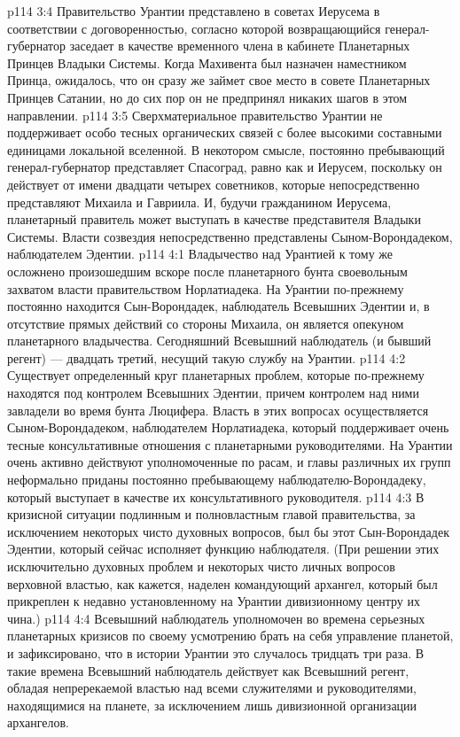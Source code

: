 \vs p114 3:4 \pc Правительство Урантии представлено в советах Иерусема в соответствии с договоренностью, согласно которой возвращающийся генерал\hyp{}губернатор заседает в качестве временного члена в кабинете Планетарных Принцев Владыки Системы. Когда Махивента был назначен наместником Принца, ожидалось, что он сразу же займет свое место в совете Планетарных Принцев Сатании, но до сих пор он не предпринял никаких шагов в этом направлении.
\vs p114 3:5 Сверхматериальное правительство Урантии не поддерживает особо тесных органических связей с более высокими составными единицами локальной вселенной. В некотором смысле, постоянно пребывающий генерал\hyp{}губернатор представляет Спасоград, равно как и Иерусем, поскольку он действует от имени двадцати четырех советников, которые непосредственно представляют Михаила и Гавриила. И, будучи гражданином Иерусема, планетарный правитель может выступать в качестве представителя Владыки Системы. Власти созвездия непосредственно представлены Сыном\hyp{}Ворондадеком, наблюдателем Эдентии.
\vs p114 4:1 Владычество над Урантией к тому же осложнено произошедшим вскоре после планетарного бунта своевольным захватом власти правительством Норлатиадека. На Урантии по\hyp{}прежнему постоянно находится Сын\hyp{}Ворондадек, наблюдатель Всевышних Эдентии и, в отсутствие прямых действий со стороны Михаила, он является опекуном планетарного владычества. Сегодняшний Всевышний наблюдатель (и бывший регент) --- двадцать третий, несущий такую службу на Урантии.
\vs p114 4:2 Существует определенный круг планетарных проблем, которые по\hyp{}прежнему находятся под контролем Всевышних Эдентии, причем контролем над ними завладели во время бунта Люцифера. Власть в этих вопросах осуществляется Сыном\hyp{}Ворондадеком, наблюдателем Норлатиадека, который поддерживает очень тесные консультативные отношения с планетарными руководителями. На Урантии очень активно действуют уполномоченные по расам, и главы различных их групп неформально приданы постоянно пребывающему наблюдателю\hyp{}Ворондадеку, который выступает в качестве их консультативного руководителя.
\vs p114 4:3 В кризисной ситуации подлинным и полновластным главой правительства, за исключением некоторых чисто духовных вопросов, был бы этот Сын\hyp{}Ворондадек Эдентии, который сейчас исполняет функцию наблюдателя. (При решении этих исключительно духовных проблем и некоторых чисто личных вопросов верховной властью, как кажется, наделен командующий архангел, который был прикреплен к недавно установленному на Урантии дивизионному центру их чина.)
\vs p114 4:4 \pc Всевышний наблюдатель уполномочен во времена серьезных планетарных кризисов по своему усмотрению брать на себя управление планетой, и зафиксировано, что в истории Урантии это случалось тридцать три раза. В такие времена Всевышний наблюдатель действует как Всевышний регент, обладая непререкаемой властью над всеми служителями и руководителями, находящимися на планете, за исключением лишь дивизионной организации архангелов.
